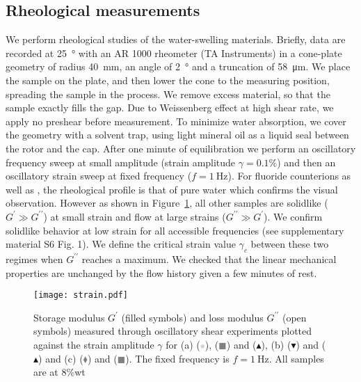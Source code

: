 \documentclass[journal=jacsat,manuscript=article]{achemso}
\begin{document}

\subsection{Rheological measurements}
We perform rheological studies of the water-swelling materials. Briefly, data are recorded at \SI{25}{\degree} with an AR 1000 rheometer (TA Instruments) in a cone-plate geometry of radius \SI{40}{\milli\metre}, an angle of \SI{2}{\degree} and a truncation of \SI{58}{\micro\metre}\cite{Macosko1994,Larson1999}. We place the sample on the plate, and then lower the cone to the measuring position, spreading the sample in the process. We remove excess material, so that the sample exactly fills the gap. Due to Weissenberg effect at high shear rate, we apply no preshear before measurement. To minimize water absorption, we cover the geometry with a solvent trap, using light mineral oil as a liquid seal between the rotor and the cap. After one minute of equilibration we perform an oscillatory frequency sweep at small amplitude (strain amplitude $\gamma=0.1\%$) and then an oscillatory strain sweep at fixed frequency ($f=\SI{1}{\hertz}$). For fluoride counterions as well as , the rheological profile is that of pure water which confirms the visual observation. However as shown in Figure~\ref{fig:strain}, all other samples are solidlike ($G^\prime \gg G^{\prime\prime}$) at small strain and flow at large strains ($G^{\prime\prime} \gg G^\prime$). We confirm solidlike behavior at low strain for all accessible frequencies (see supplementary material S6 Fig. 1). We define the critical strain value $\gamma_c$ between these two regimes when $G^{\prime\prime}$ reaches a maximum. We checked that the linear mechanical properties are unchanged by the flow history given a few minutes of rest. %

\begin{figure}
\texttt{[image: strain.pdf]}
\caption{Storage modulus $G^\prime$ (filled symbols) and loss modulus $G^{\prime\prime}$ (open symbols) measured through oscillatory shear experiments plotted against the strain amplitude $\gamma$ for (a)  (\textcolor{lightgray}{$\bullet$}),  (\textcolor{gray}{$\blacksquare$}) and  ($\blacktriangle$), (b)  ($\blacktriangledown$) and  ($\blacktriangle$) and (c)  (\textcolor{gray}{$\blacklozenge$}) and  (\textcolor{gray}{$\blacksquare$}). The fixed frequency is $f=\SI{1}{\hertz}$. All samples are at 8\%wt }
\label{fig:strain}
\end{figure}
\end{document}
